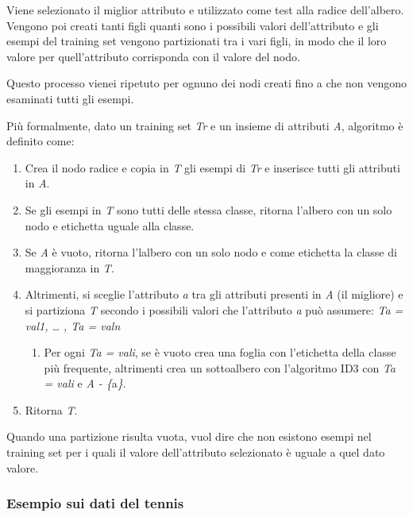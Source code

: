 Viene selezionato il miglior attributo e utilizzato come test alla
radice dell'albero. Vengono poi creati tanti figli quanti sono i
possibili valori dell'attributo e gli esempi del training set vengono
partizionati tra i vari figli, in modo che il loro valore per
quell'attributo corrisponda con il valore del nodo.

Questo processo vienei ripetuto per ognuno dei nodi creati fino a che
non vengono esaminati tutti gli esempi.

Più formalmente, dato un training set \emph{Tr} e un insieme di
attributi \emph{A}, algoritmo è definito come:

\begin{enumerate}
\def\labelenumi{\arabic{enumi}.}
\tightlist
\item
  Crea il nodo radice e copia in \emph{T} gli esempi di \emph{Tr} e
  inserisce tutti gli attributi in \emph{A}.
\item
  Se gli esempi in \emph{T} sono tutti delle stessa classe, ritorna
  l'albero con un solo nodo e etichetta uguale alla classe.
\item
  Se \emph{A} è vuoto, ritorna l'lalbero con un solo nodo e come
  etichetta la classe di maggioranza in \emph{T}.
\item
  Altrimenti, si sceglie l'attributo \emph{a} tra gli attributi presenti
  in \emph{A} (il migliore) e si partiziona \emph{T} secondo i possibili
  valori che l'attributo \emph{a} può assumere: \emph{Ta = val1,
  \ldots{} , Ta = valn}

  \begin{enumerate}
  \def\labelenumii{\arabic{enumii}.}
  \tightlist
  \item
    Per ogni \emph{Ta = vali}, se è vuoto crea una foglia con
    l'etichetta della classe più frequente, altrimenti crea un
    sottoalbero con l'algoritmo ID3 con \emph{Ta = vali} e \emph{A -
    \{}a\emph{\}}.
  \end{enumerate}
\item
  Ritorna \emph{T}.
\end{enumerate}

Quando una partizione risulta vuota, vuol dire che non esistono esempi
nel training set per i quali il valore dell'attributo selezionato è
uguale a quel dato valore.

\subsubsection{Esempio sui dati del
tennis}\label{esempio-sui-dati-del-tennis}

